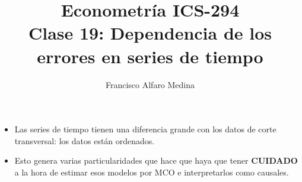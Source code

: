 \documentclass{beamer}
\title[ICS-162]{Econometría ICS-294\\ \small{Clase 19: Dependencia de los errores en series de tiempo}}
\author{Francisco Alfaro Medina}
\institute[USM]
{Universidad Técnica Federico Santa María\\ %
	\medskip
	\textit{} %
	
}
\date{}
\begin{document}
	
\begin{frame}
	\titlepage %


\end{frame}

\begin{frame}{}

    \begin{itemize}
  \item Las series de tiempo tienen una diferencia grande con los datos de corte transversal: los datos están ordenados.
  \item Esto genera varias particularidades que hace que haya que tener \textbf{CUIDADO} a la hora de estimar esos modelos por MCO e interpretarlos como causales.
  \end{itemize}
\end{frame}
\end{document}
